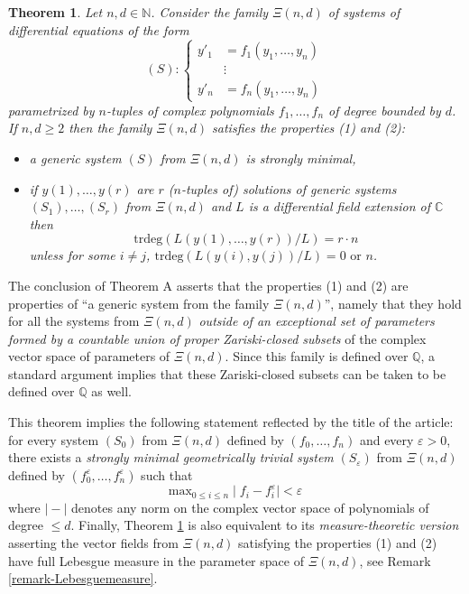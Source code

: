 \documentclass[12pt]{amsart}
\theoremstyle{definition}
\theoremstyle{plain}
\theoremstyle{exampstyle}
\newtheorem{thmx}{Theorem}
\theoremstyle{exampstyle}\newtheorem{thmxbis}{Theorem}
\numberwithin{equation}{section}
\theoremstyle{remark}
\begin{document}
\begin{thmx} \label{theoremA}
Let $n,d \in \mathbb{N}$. Consider the family $\Xi(n,d)$ of systems of differential equations of the form 
$$ (S): \begin{cases} y'_1 & =  f_1(y_1,\ldots, y_n) \\  &\vdots  \\  y'_n & =   f_n(y_1,\ldots, y_n)  \end{cases} $$ 
parametrized by $n$-tuples of complex polynomials $f_1,\ldots, f_n$ of degree bounded by $d$. If $n,d \geq 2$ then the family $\Xi(n,d)$ satisfies the properties (1) and (2): 
\begin{itemize} 
\item[(1)] a {\em generic} system $(S)$ from $\Xi(n,d)$ is strongly minimal,
\item[(2)] if $y(1),\ldots, y(r)$ are $r$  ($n$-tuples of) solutions of {\em generic} systems $(S_1),\ldots , (S_r)$ from $\Xi(n,d)$ and $L$ is a differential field extension of $\mathbb{C}$ then 
$$\mathrm{trdeg}(L (y(1),\ldots,y(r)) /L) = r \cdot n$$
unless for some $i \neq j$,  $\mathrm{trdeg}(L(y(i),y(j))/L) = 0 \text{ or } n$.
\end{itemize}  
\end{thmx}  
 


The conclusion of Theorem A asserts that the properties (1) and (2) are properties of ``a generic system from the family $\Xi(n,d)$'', namely that they hold for all the systems from $\Xi(n,d)$ {\em outside of an exceptional set of parameters formed by a countable union of proper Zariski-closed subsets} of the complex vector space of parameters of $\Xi(n,d)$. Since this family is defined over $\mathbb{Q}$, a standard argument implies that these Zariski-closed subsets can be taken to be  defined over $\mathbb{Q}$ as well. 

This theorem implies the following statement reflected by the title of the article: for every system $(S_0)$ from $\Xi(n,d)$ defined by $(f_0,\ldots, f_n)$ and every $\varepsilon > 0$, there exists a {\em strongly minimal geometrically trivial system} $(S_\varepsilon)$ from $\Xi(n,d)$ defined by $(f^\varepsilon_0,\ldots, f^\varepsilon_n)$ such that
$$ \mathrm{max}_{0 \leq i \leq n} \mid f_i - f^\varepsilon_i \mid < \varepsilon $$ 
where $\mid-\mid$ denotes any norm on the complex vector space of polynomials of degree $\leq d$. Finally, Theorem \ref{theoremA} is also equivalent to its {\em measure-theoretic version} asserting the vector fields from $\Xi(n,d)$ satisfying the properties (1) and (2) have full Lebesgue measure in the parameter space of $\Xi(n,d)$, see Remark \ref{remark-Lebesguemeasure}.  \\
\end{document}
